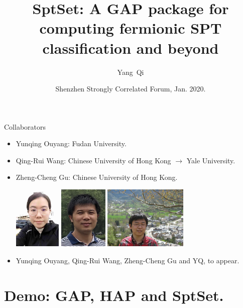 \documentclass[xcolor=table, aspectratio=169]{beamer}
\title[Intro to SptSet] %
{SptSet: A GAP package for computing fermionic SPT classification and beyond}
\author[Y Qi] %
{Yang~Qi}
\institute[Fudan] %
{Department of Physics, Fudan University}
\date{Shenzhen Strongly Correlated Forum, Jan. 2020.}
\begin{document}
\begin{frame}
  \titlepage
\end{frame}

\begin{frame}{Collaborators}
\begin{itemize}
\item Yunqing Ouyang: Fudan University.
\item Qing-Rui Wang: Chinese University of Hong Kong $\rightarrow$ Yale University.
\item Zheng-Cheng Gu: Chinese University of Hong Kong.
\begin{center}
	\includegraphics[height=3cm]{../people/yunqing}
	\includegraphics[height=3cm]{../people/qingrui}
	\includegraphics[height=3cm]{../people/zhengcheng}
\end{center}
\item Yunqing Ouyang, Qing-Rui Wang, Zheng-Cheng Gu and YQ, to appear.
\end{itemize}
\end{frame}

\section{Demo: GAP, HAP and SptSet.}
\end{document}

